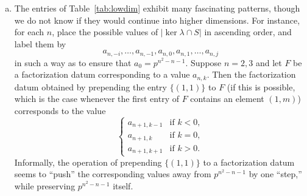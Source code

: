 \begin{rem}
\begin{enumerate}[(a)]
\item The entries of Table~\ref{tab:lowdim} exhibit many fascinating patterns, though we do not know if they would continue into higher dimensions. For instance, for each $n$, place the possible values of $|\ker\lambda\cap S|$ in ascending order, and label them by
\begin{equation*}
a_{n,-i},\ldots,a_{n,-1},a_{n,0},a_{n,1},\ldots,a_{n,j}
\end{equation*}
in such a way as to ensure that $a_0=p^{n^2-n-1}$. Suppose $n=2,3$ and let $F$ be a factorization datum corresponding to a value $a_{n,k}$. Then the factorization datum obtained by prepending the entry $\{(1,1)\}$ to $F$ (if this is possible, which is the case whenever the first entry of $F$ contains an element $(1,m)$) corresponds to the value
\begin{equation*}
\begin{cases}
a_{n+1,k-1}&\text{if }k<0,\\
a_{n+1,k}&\text{if }k=0,\\
a_{n+1,k+1}&\text{if }k>0.
\end{cases}
\end{equation*}
Informally, the operation of prepending $\{(1,1)\}$ to a factorization datum seems to ``push'' the corresponding values away from $p^{n^2-n-1}$ by one ``step,'' while preserving $p^{n^2-n-1}$ itself.
\end{enumerate}
\end{rem}

